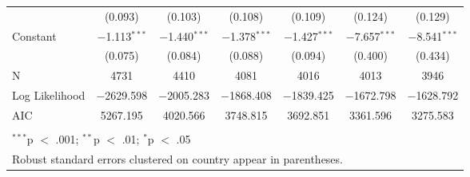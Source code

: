 \begin{table}[!htbp]
\begin{tabular}{@{\extracolsep{5pt}}lcccccc}
  & (0.093) & (0.103) & (0.108) & (0.109) & (0.124) & (0.129) \\ 
  Constant & $-$1.113$^{***}$ & $-$1.440$^{***}$ & $-$1.378$^{***}$ & $-$1.427$^{***}$ & $-$7.657$^{***}$ & $-$8.541$^{***}$ \\ 
  & (0.075) & (0.084) & (0.088) & (0.094) & (0.400) & (0.434) \\ 
 N & 4731 & 4410 & 4081 & 4016 & 4013 & 3946 \\ 
Log Likelihood & $-$2629.598 & $-$2005.283 & $-$1868.408 & $-$1839.425 & $-$1672.798 & $-$1628.792 \\ 
AIC & 5267.195 & 4020.566 & 3748.815 & 3692.851 & 3361.596 & 3275.583 \\ 
\hline \\[-1.8ex] 
\multicolumn{7}{l}{$^{***}$p $<$ .001; $^{**}$p $<$ .01; $^{*}$p $<$ .05} \\ 
\multicolumn{7}{l}{Robust standard errors clustered on country appear in parentheses.} \\ 
\end{tabular} 
\end{table} 
